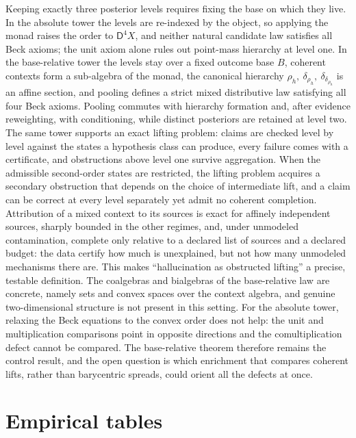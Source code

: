 \documentclass[11pt]{article}
\theoremstyle{definition}
\theoremstyle{remark}
\newcommand{\D}{\mathsf{D}}
\begin{document}
Keeping exactly three posterior levels requires fixing the base on which they live. In the
absolute tower the levels are re-indexed by the object, so applying the monad raises the order to
$\D^4X$, and neither natural candidate law satisfies all Beck axioms; the unit axiom alone rules out
point-mass hierarchy at level one. In the base-relative tower the levels stay over a fixed outcome
base $B$, coherent contexts form a sub-algebra of the monad, the canonical hierarchy
$\rho_h,\ \delta_{\rho_h},\ \delta_{\delta_{\rho_h}}$ is an affine section, and pooling defines a strict
mixed distributive law satisfying all four Beck axioms. Pooling commutes with hierarchy formation and, after evidence reweighting, with conditioning,
while distinct posteriors are retained at level two. The same tower supports an exact lifting
problem: claims are checked level by level against the states a hypothesis class can produce, every
failure comes with a certificate, and obstructions above level one survive aggregation. When the
admissible second-order states are restricted, the lifting problem acquires a secondary obstruction
that depends on the choice of intermediate lift, and a claim can be correct at every level separately
yet admit no coherent completion. Attribution of a mixed context to its sources is exact for affinely
independent sources, sharply bounded in the other regimes, and, under unmodeled contamination,
complete only relative to a declared list of sources and a declared budget: the data certify how much
is unexplained, but not how many unmodeled mechanisms there are. This makes
``hallucination as obstructed lifting'' a precise, testable definition. The coalgebras and
bialgebras of the base-relative law are concrete, namely sets and convex spaces over the context
algebra, and genuine two-dimensional structure is not present in this setting. For the absolute
tower, relaxing the Beck equations to the convex order does not help: the unit and multiplication
comparisons point in opposite directions and the comultiplication defect cannot be compared. The
base-relative theorem therefore remains the control result, and the open question is which enrichment
that compares coherent lifts, rather than barycentric spreads, could orient all the defects at once.

\appendix

\section{Empirical tables}\label{app:empirical}
\end{document}
